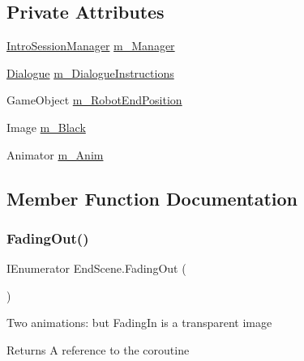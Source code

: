 \subsection*{Private Attributes}
\begin{DoxyCompactItemize}
\item 
\mbox{\hyperlink{class_intro_session_manager}{Intro\+Session\+Manager}} \mbox{\hyperlink{class_end_scene_a55d85fe74c61b09ec0bbf2f8eb6a7a43}{m\+\_\+\+Manager}}
\item 
\mbox{\hyperlink{class_dialogue}{Dialogue}} \mbox{\hyperlink{class_end_scene_ae1a4aeefdb40b81df7d910bfb7c909b9}{m\+\_\+\+Dialogue\+Instructions}}
\item 
Game\+Object \mbox{\hyperlink{class_end_scene_a2b10ad0874c9ad181f1dd93d93bd246a}{m\+\_\+\+Robot\+End\+Position}}
\item 
Image \mbox{\hyperlink{class_end_scene_a9b30c59b3252565d3b2bf3de29fe4403}{m\+\_\+\+Black}}
\item 
Animator \mbox{\hyperlink{class_end_scene_a85e334f53cb4f5b9b44c499b5224cc62}{m\+\_\+\+Anim}}
\end{DoxyCompactItemize}


\subsection{Member Function Documentation}
\mbox{\label{class_end_scene_aee3c069e59445bbd2c6cfa69f498fead}} 
\subsubsection{\texorpdfstring{Fading\+Out()}{FadingOut()}}
{\footnotesize\ttfamily I\+Enumerator End\+Scene.\+Fading\+Out (\begin{DoxyParamCaption}{ }\end{DoxyParamCaption})\hspace{0.3cm}{\ttfamily [private]}}



Two animations\+: but Fading\+In is a transparent image 

\begin{DoxyReturn}{Returns}
A reference to the coroutine
\end{DoxyReturn}
\mbox{\label{class_end_scene_aad3f8f074f1937a0615f21e95b74f33c}} 

